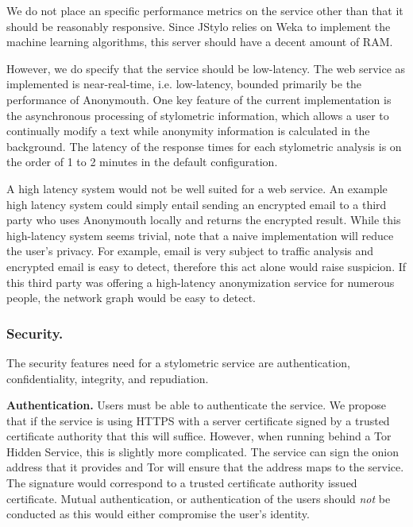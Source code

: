 \documentclass[letterpaper]{article}
\begin{document}
We do not place an specific performance metrics on the service other
than that it should be reasonably responsive.  Since JStylo relies on
Weka \cite{Hall:2009:WDM:1656274.1656278} to implement the machine
learning algorithms, this server should have a decent amount of RAM.

However, we do specify that the service should be low-latency.  The
web service as implemented is near-real-time, i.e. low-latency,
bounded primarily be the performance of Anonymouth. One key feature of
the current implementation is the asynchronous processing of
stylometric information, which allows a user to continually modify a
text while anonymity information is calculated in the background. The
latency of the response times for each stylometric analysis is on the
order of 1 to 2 minutes in the default configuration.

A high latency system would not be well suited for a web service.  An
example high latency system could simply entail sending an encrypted
email to a third party who uses Anonymouth locally and returns the
encrypted result.  While this high-latency system seems trivial, note
that a naive implementation will reduce the user's privacy.  For
example, email is very subject to traffic analysis
\cite{Mathewson04practicaltraffic} and encrypted email is easy to
detect, therefore this act alone would raise suspicion.  If
this third party was offering a high-latency anonymization service
for numerous people, the network graph would be easy to detect.

\subsubsection{Security.}

The security features need for a stylometric service are
authentication, confidentiality, integrity, and repudiation.

{\bf Authentication.}  Users must be able to authenticate the
service.  We propose that if the service is using HTTPS with a server
certificate signed by a trusted certificate authority that this will
suffice.  However, when running behind a Tor Hidden Service, this is
slightly more complicated.  The service can sign the onion address
that it provides and Tor will ensure that the address maps to the
service.  The signature would correspond to a trusted certificate
authority issued certificate.  Mutual authentication, or
authentication of the users should \emph{not} be conducted as this
would either compromise the user's identity.
\end{document}
